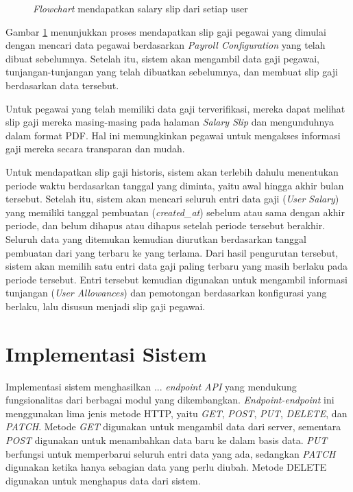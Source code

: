 \begin{figure}[H]
    \caption{\textit{Flowchart} mendapatkan salary slip dari setiap user}
    \label{fig:mendapatkan_salary_slip_dari_setiap_user}
\end{figure}

Gambar \ref{fig:mendapatkan_salary_slip_dari_setiap_user} menunjukkan proses mendapatkan slip gaji pegawai yang dimulai dengan mencari data pegawai berdasarkan \textit{Payroll Configuration} yang telah dibuat sebelumnya. Setelah itu, sistem akan mengambil data gaji pegawai, tunjangan-tunjangan yang telah dibuatkan sebelumnya, dan membuat slip gaji berdasarkan data tersebut. 

Untuk pegawai yang telah memiliki data gaji terverifikasi, mereka dapat melihat slip gaji mereka masing-masing pada halaman \textit{Salary Slip} dan mengunduhnya dalam format PDF. Hal ini memungkinkan pegawai untuk mengakses informasi gaji mereka secara transparan dan mudah.

Untuk mendapatkan slip gaji historis, sistem akan terlebih dahulu menentukan periode waktu berdasarkan tanggal yang diminta, yaitu awal hingga akhir bulan tersebut. Setelah itu, sistem akan mencari seluruh entri data gaji (\textit{User Salary}) yang memiliki tanggal pembuatan (\textit{created\_at}) sebelum atau sama dengan akhir periode, dan belum dihapus atau dihapus setelah periode tersebut berakhir. Seluruh data yang ditemukan kemudian diurutkan berdasarkan tanggal pembuatan dari yang terbaru ke yang terlama. Dari hasil pengurutan tersebut, sistem akan memilih satu entri data gaji paling terbaru yang masih berlaku pada periode tersebut. Entri tersebut kemudian digunakan untuk mengambil informasi tunjangan (\textit{User Allowances}) dan pemotongan berdasarkan konfigurasi yang berlaku, lalu disusun menjadi slip gaji pegawai.

\section{Implementasi Sistem}
Implementasi sistem menghasilkan ... \textit{endpoint API} yang mendukung fungsionalitas dari berbagai modul yang dikembangkan. \textit{Endpoint-endpoint} ini menggunakan lima jenis metode HTTP, yaitu \textit{GET}, \textit{POST}, \textit{PUT}, \textit{DELETE}, dan \textit{PATCH}. Metode \textit{GET} digunakan untuk mengambil data dari server, sementara \textit{POST} digunakan untuk menambahkan data baru ke dalam basis data. \textit{PUT} berfungsi untuk memperbarui seluruh entri data yang ada, sedangkan \textit{PATCH} digunakan ketika hanya sebagian data yang perlu diubah. Metode {DELETE} digunakan untuk menghapus data dari sistem.

